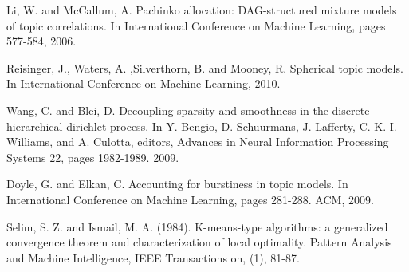 \documentclass[conference]{IEEEtran}
\begin{document}
\begin{thebibliography}{1}
Li, W. and McCallum, A. Pachinko allocation: DAG-structured mixture models of topic correlations. In International Conference on Machine Learning, pages 577-584, 2006.

Reisinger, J., Waters, A. ,Silverthorn, B. and Mooney, R. Spherical topic models. In International Conference on Machine Learning, 2010.

Wang, C. and Blei, D. Decoupling sparsity and smoothness in the discrete hierarchical dirichlet process. In Y. Bengio, D. Schuurmans, J. Lafferty, C. K. I. Williams, and A. Culotta, editors, Advances in Neural Information Processing Systems 22, pages 1982-1989. 2009.

Doyle, G. and Elkan, C. Accounting for burstiness in topic models. In International Conference on Machine Learning, pages 281-288. ACM, 2009.

Selim, S. Z. and Ismail, M. A. (1984). K-means-type algorithms: a generalized convergence theorem and characterization of local optimality. Pattern Analysis and Machine Intelligence, IEEE Transactions on, (1), 81-87.
\end{thebibliography}




\end{document}
